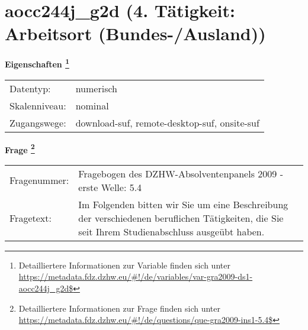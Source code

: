 
    \setcounter{footnote}{0}

    \vspace*{-1.8cm}
	\section{aocc244j\_g2d (4. Tätigkeit: Arbeitsort (Bundes-/Ausland))}
	\label{section:aocc244j_g2d}



    \vspace*{0.5cm}
    \noindent\textbf{Eigenschaften
	\footnote{Detailliertere Informationen zur Variable finden sich unter
		\url{https://metadata.fdz.dzhw.eu/\#!/de/variables/var-gra2009-ds1-aocc244j_g2d$}}}\\
	\begin{tabularx}{\hsize}{@{}lX}
	Datentyp: & numerisch \\
	Skalenniveau: & nominal \\
	Zugangswege: &
	  download-suf, 
	  remote-desktop-suf, 
	  onsite-suf
 \\
    \end{tabularx}



				\vspace*{0.5cm}
                \noindent\textbf{Frage
	                \footnote{Detailliertere Informationen zur Frage finden sich unter
		              \url{https://metadata.fdz.dzhw.eu/\#!/de/questions/que-gra2009-ins1-5.4$}}}\\
				\begin{tabularx}{\hsize}{@{}lX}
					Fragenummer: &
					  Fragebogen des DZHW-Absolventenpanels 2009 - erste Welle:
					  5.4
 \\
					Fragetext: & Im Folgenden bitten wir Sie um eine Beschreibung der verschiedenen beruflichen Tätigkeiten, die Sie seit Ihrem Studienabschluss ausgeübt haben. \\
				\end{tabularx}





